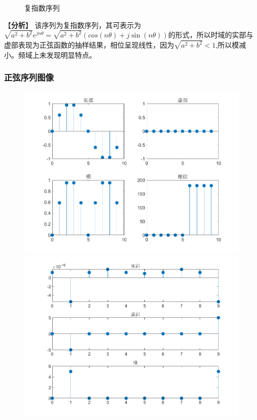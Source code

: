 \documentclass{../source/zjureport}
\begin{document}
\begin{figure}[htbp]
\begin{minipage}[t]{0.48\textwidth}
                    \end{minipage}
                    \caption{复指数序列}
                \end{figure}


                【\textbf{分析}】
                该序列为复指数序列，其可表示为$\sqrt{a^2+b^2}e^{jn\theta} =\sqrt{a^2+b^2}(cos(n\theta)+j\sin(n\theta))$的形式，所以时域的实部与虚部表现为正弦函数的抽样结果，相位呈现线性，因为$\sqrt{a^2+b^2}<1$,所以模减小。频域上未发现明显特点。
                

            \subsubsection{正弦序列图像}
                \begin{figure}[htbp]
                    \centering
                    \begin{minipage}[t]{0.48\textwidth}
                    \centering
                    \includegraphics[width=\textwidth]{figure/正弦序列.png}
                    \end{minipage}
                    \begin{minipage}[t]{0.48\textwidth}
                    \centering
                    \includegraphics[width=\textwidth]{figure/频谱_正弦序列.png}

\end{minipage}
\end{figure}
\end{document}
